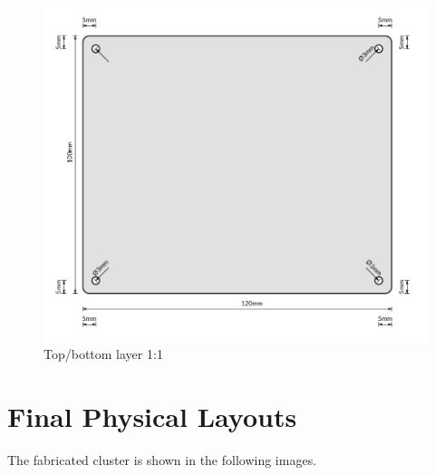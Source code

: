 \newpage

\begin{figure}[H]
	\centering
	\includegraphics[width=16cm]{figures/cluster/top_bottom_layer}
	\caption{Top/bottom layer 1:1}
	\label{fig:cluster_top_bottom_layer}
\end{figure}

\newpage
\section*{Final Physical Layouts}
The fabricated cluster is shown in the following images.

